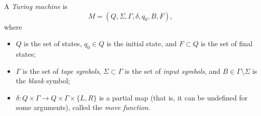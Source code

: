 

\setcounter{section}{8}
\setcounter{subsection}{1}
\setcounter{dfn}{0}

\begin{dfn}
A \emph{Turing machine} is
\[
M = (Q, \Sigma, \Gamma, \delta, q_0, B, F),
\]
where
\begin{itemize}
\item
$Q$ is the set of states, $q_0 \in Q$ is the initial state, and $F \subset Q$ is the set of final states;
\item
$\Gamma$ is the set of \emph{tape symbols}, $\Sigma \subset \Gamma$ is the set of \emph{input symbols},
and $B \in \Gamma \setminus \Sigma$ is the \emph{blank} symbol;
\item
$\delta \colon Q \times \Gamma \to Q \times \Gamma \times \{L, R\}$
is a partial map (that is, it can be undefined for some arguments), called the \emph{move function}.
\end{itemize}
\end{dfn}


